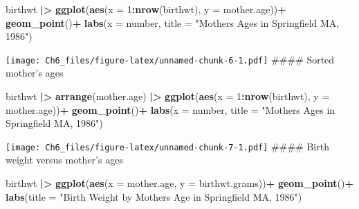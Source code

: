 \documentclass[
]{article}
\newenvironment{Shaded}{\begin{snugshade}}{\end{snugshade}}
\newcommand{\AttributeTok}[1]{\textcolor[rgb]{0.13,0.29,0.53}{#1}}
\newcommand{\DecValTok}[1]{\textcolor[rgb]{0.00,0.00,0.81}{#1}}
\newcommand{\FunctionTok}[1]{\textcolor[rgb]{0.13,0.29,0.53}{\textbf{#1}}}
\newcommand{\NormalTok}[1]{#1}
\newcommand{\SpecialCharTok}[1]{\textcolor[rgb]{0.81,0.36,0.00}{\textbf{#1}}}
\newcommand{\StringTok}[1]{\textcolor[rgb]{0.31,0.60,0.02}{#1}}
\begin{document}
\begin{Shaded}
\begin{Highlighting}[]
\NormalTok{birthwt }\SpecialCharTok{|\textgreater{}} \FunctionTok{ggplot}\NormalTok{(}\FunctionTok{aes}\NormalTok{(}\AttributeTok{x =} \DecValTok{1}\SpecialCharTok{:}\FunctionTok{nrow}\NormalTok{(birthwt), }\AttributeTok{y =}\NormalTok{ mother.age))}\SpecialCharTok{+}
  \FunctionTok{geom\_point}\NormalTok{()}\SpecialCharTok{+}
  \FunctionTok{labs}\NormalTok{(}\AttributeTok{x =} \StringTok{\textquotesingle{}number\textquotesingle{}}\NormalTok{, }\AttributeTok{title =} \StringTok{"Mother\textquotesingle{}s Ages in Springfield MA, 1986"}\NormalTok{)}
\end{Highlighting}
\end{Shaded}

\texttt{[image: Ch6\_files/figure-latex/unnamed-chunk-6-1.pdf]} \#\#\#\#
Sorted mother's ages

\begin{Shaded}
\begin{Highlighting}[]
\NormalTok{birthwt }\SpecialCharTok{|\textgreater{}} \FunctionTok{arrange}\NormalTok{(mother.age) }\SpecialCharTok{|\textgreater{}} \FunctionTok{ggplot}\NormalTok{(}\FunctionTok{aes}\NormalTok{(}\AttributeTok{x =} \DecValTok{1}\SpecialCharTok{:}\FunctionTok{nrow}\NormalTok{(birthwt), }\AttributeTok{y =}\NormalTok{ mother.age))}\SpecialCharTok{+}
  \FunctionTok{geom\_point}\NormalTok{()}\SpecialCharTok{+}
  \FunctionTok{labs}\NormalTok{(}\AttributeTok{x =} \StringTok{\textquotesingle{}number\textquotesingle{}}\NormalTok{, }\AttributeTok{title =} \StringTok{"Mother\textquotesingle{}s Ages in Springfield MA, 1986"}\NormalTok{)}
\end{Highlighting}
\end{Shaded}

\texttt{[image: Ch6\_files/figure-latex/unnamed-chunk-7-1.pdf]} \#\#\#\#
Birth weight versus mother's ages

\begin{Shaded}
\begin{Highlighting}[]
\NormalTok{birthwt }\SpecialCharTok{|\textgreater{}} \FunctionTok{ggplot}\NormalTok{(}\FunctionTok{aes}\NormalTok{(}\AttributeTok{x =}\NormalTok{ mother.age, }\AttributeTok{y =}\NormalTok{ birthwt.grams))}\SpecialCharTok{+}
  \FunctionTok{geom\_point}\NormalTok{()}\SpecialCharTok{+}
  \FunctionTok{labs}\NormalTok{(}\AttributeTok{title =} \StringTok{"Birth Weight by Mother\textquotesingle{}s Age in Springfield MA, 1986"}\NormalTok{)}
\end{Highlighting}
\end{Shaded}
\end{document}
